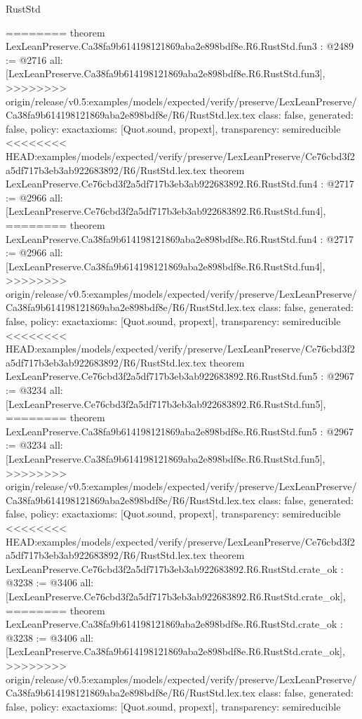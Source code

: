 \begin{lexlean}{RustStd}
\begin{coremodule}
{\begin{coremodule}
{{{{{{========
theorem LexLeanPreserve.Ca38fa9b614198121869aba2e898bdf8e.R6.RustStd.fun3 : @2489 := @2716 {
  all: [LexLeanPreserve.Ca38fa9b614198121869aba2e898bdf8e.R6.RustStd.fun3],
>>>>>>>> origin/release/v0.5:examples/models/expected/verify/preserve/LexLeanPreserve/Ca38fa9b614198121869aba2e898bdf8e/R6/RustStd.lex.tex
  class: false,
  generated: false,
  policy: exact{axioms: [Quot.sound, propext]},
  transparency: semireducible
}
<<<<<<<< HEAD:examples/models/expected/verify/preserve/LexLeanPreserve/Ce76cbd3f2a5df717b3eb3ab922683892/R6/RustStd.lex.tex
theorem LexLeanPreserve.Ce76cbd3f2a5df717b3eb3ab922683892.R6.RustStd.fun4 : @2717 := @2966 {
  all: [LexLeanPreserve.Ce76cbd3f2a5df717b3eb3ab922683892.R6.RustStd.fun4],
========
theorem LexLeanPreserve.Ca38fa9b614198121869aba2e898bdf8e.R6.RustStd.fun4 : @2717 := @2966 {
  all: [LexLeanPreserve.Ca38fa9b614198121869aba2e898bdf8e.R6.RustStd.fun4],
>>>>>>>> origin/release/v0.5:examples/models/expected/verify/preserve/LexLeanPreserve/Ca38fa9b614198121869aba2e898bdf8e/R6/RustStd.lex.tex
  class: false,
  generated: false,
  policy: exact{axioms: [Quot.sound, propext]},
  transparency: semireducible
}
<<<<<<<< HEAD:examples/models/expected/verify/preserve/LexLeanPreserve/Ce76cbd3f2a5df717b3eb3ab922683892/R6/RustStd.lex.tex
theorem LexLeanPreserve.Ce76cbd3f2a5df717b3eb3ab922683892.R6.RustStd.fun5 : @2967 := @3234 {
  all: [LexLeanPreserve.Ce76cbd3f2a5df717b3eb3ab922683892.R6.RustStd.fun5],
========
theorem LexLeanPreserve.Ca38fa9b614198121869aba2e898bdf8e.R6.RustStd.fun5 : @2967 := @3234 {
  all: [LexLeanPreserve.Ca38fa9b614198121869aba2e898bdf8e.R6.RustStd.fun5],
>>>>>>>> origin/release/v0.5:examples/models/expected/verify/preserve/LexLeanPreserve/Ca38fa9b614198121869aba2e898bdf8e/R6/RustStd.lex.tex
  class: false,
  generated: false,
  policy: exact{axioms: [Quot.sound, propext]},
  transparency: semireducible
}
<<<<<<<< HEAD:examples/models/expected/verify/preserve/LexLeanPreserve/Ce76cbd3f2a5df717b3eb3ab922683892/R6/RustStd.lex.tex
theorem LexLeanPreserve.Ce76cbd3f2a5df717b3eb3ab922683892.R6.RustStd.crate_ok : @3238 := @3406 {
  all: [LexLeanPreserve.Ce76cbd3f2a5df717b3eb3ab922683892.R6.RustStd.crate_ok],
========
theorem LexLeanPreserve.Ca38fa9b614198121869aba2e898bdf8e.R6.RustStd.crate_ok : @3238 := @3406 {
  all: [LexLeanPreserve.Ca38fa9b614198121869aba2e898bdf8e.R6.RustStd.crate_ok],
>>>>>>>> origin/release/v0.5:examples/models/expected/verify/preserve/LexLeanPreserve/Ca38fa9b614198121869aba2e898bdf8e/R6/RustStd.lex.tex
  class: false,
  generated: false,
  policy: exact{axioms: [Quot.sound, propext]},
  transparency: semireducible
}}}}}}}}}}
\end{coremodule}}
\end{coremodule}
\end{lexlean}
